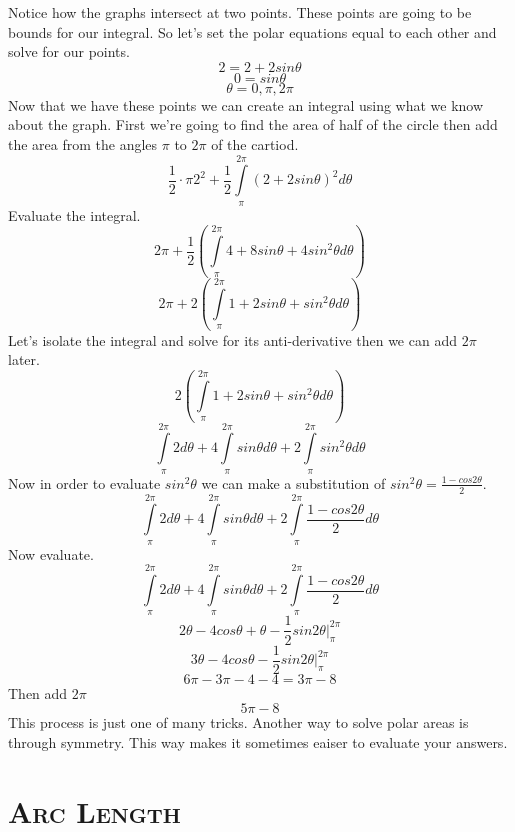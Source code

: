 \documentclass[a4paper,openright, 14pt]{article}
\newcommand{\ssection}[1]{%
\section[#1]{\centering\normalfont\scshape #1}}
\begin{document}
Notice how the graphs intersect at two points. These points are going to be bounds for our integral. So let's set the polar equations equal to each other and solve for our points.
$$2=2+2sin\theta$$
$$0=sin\theta$$
$$\theta=0,\pi,2\pi$$
Now that we have these points we can create an integral using what we know about the graph. First we're going to find the area of half of the circle then add the area from the angles $\pi$ to $2\pi$ of the cartiod.
$$\frac{1}{2}\cdot \pi 2^2 + \frac{1}{2}\int\limits_\pi ^{2\pi}(2+2sin\theta)^2 d\theta$$
Evaluate the integral.
$$2\pi +\frac{1}{2}(\int\limits_\pi ^{2\pi}4+8sin\theta+4sin^2\theta d\theta)$$
$$2\pi +2(\int\limits_\pi ^{2\pi}1+2sin\theta+sin^2\theta  d\theta)$$
Let's isolate the integral and solve for its anti-derivative then we can add $2\pi$ later.
$$2(\int\limits_\pi ^{2\pi}1+2sin\theta+sin^2\theta d\theta)$$
$$\int\limits_\pi ^{2\pi}2d\theta + 4\int\limits_\pi ^{2\pi}sin\theta d\theta +2\int\limits_\pi ^{2\pi}sin^2\theta d\theta$$
Now in order to evaluate $sin^2 \theta$ we can make a substitution of $sin^2 \theta=\frac{1-cos2\theta}{2}$.
$$\int\limits_\pi ^{2\pi}2d\theta + 4\int\limits_\pi ^{2\pi}sin\theta d\theta +2\int\limits_\pi ^{2\pi}\frac{1-cos2\theta}{2} d\theta$$
Now evaluate.
$$\int\limits_\pi ^{2\pi}2d\theta + 4\int\limits_\pi ^{2\pi}sin\theta d\theta +2\int\limits_\pi ^{2\pi}\frac{1-cos2\theta}{2} d\theta$$
$$2\theta - 4cos\theta +\theta-\frac{1}{2}sin2\theta|_\pi^{2\pi}$$
$$3\theta - 4cos\theta-\frac{1}{2}sin2\theta|_\pi^{2\pi}$$
$$6\pi-3\pi-4-4=3\pi-8$$
Then add $2\pi$
$$5\pi - 8$$
This process is just one of many tricks. Another way to solve polar areas is through symmetry. This way makes it sometimes eaiser to evaluate your answers.
\ssection{Arc Length}
\end{document}
